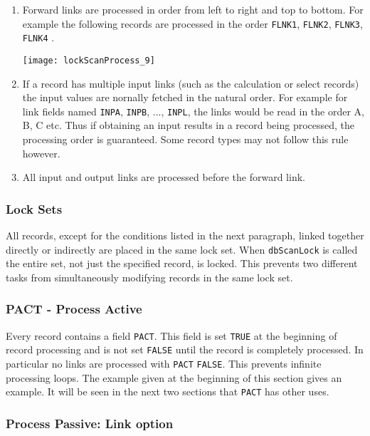 \begin{enumerate}
\item Forward links are processed in order from left to right and top to bottom. For example the following records are 
processed in the order \verb|FLNK1|, \verb|FLNK2|, \verb|FLNK3|, \verb|FLNK4| .

\begin{center}
\texttt{[image: lockScanProcess\_9]}
\end{center}

\item If a record has multiple input links (such as the calculation or select records) the input values are nornally fetched in the natural order.
For example for link fields named \verb|INPA|, \verb|INPB|, ..., \verb|INPL|, the links would be read in the order A, B, C etc.
Thus if obtaining an input results in a record being processed, the processing order is guaranteed.
Some record types may not follow this rule however.

\item All input and output links are processed before the forward link.

\end{enumerate}

\subsubsection{Lock Sets}

All records, except for the conditions listed in the next paragraph, linked together directly or indirectly are placed in the 
same lock set.
When \verb|dbScanLock| is called the entire set, not just the specified record, is locked.
This prevents two different tasks from simultaneously modifying records in the same lock set.

\subsubsection{PACT - Process Active}

Every record contains a field \verb|PACT|.
This field is set \verb|TRUE| at the beginning of record processing and is not set \verb|FALSE| until the record is completely processed.
In particular no links are processed with \verb|PACT| \verb|FALSE|.
This prevents infinite processing loops.
The example given at the beginning of this section gives an example.
It will be seen in the next two sections that \verb|PACT| has other uses.

\subsubsection{Process Passive: Link option}

